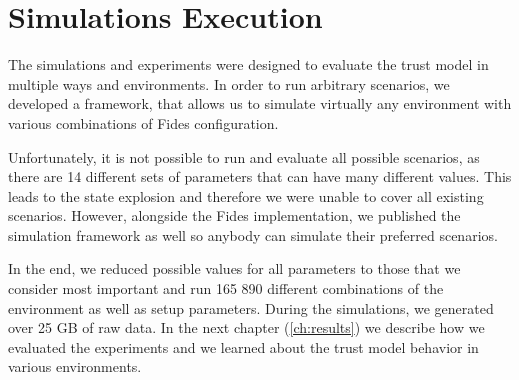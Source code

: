 \section{Simulations Execution}
\label{sec:simulations-execution}
The simulations and experiments were designed to evaluate the trust model in multiple ways and environments.
In order to run arbitrary scenarios, we developed a framework, that allows us to simulate virtually any environment with various combinations of Fides configuration.

Unfortunately, it is not possible to run and evaluate all possible scenarios, as there are 14 different sets of parameters that can have many different values.
This leads to the state explosion and therefore we were unable to cover all existing scenarios. 
However, alongside the Fides implementation, we published the simulation framework as well so anybody can simulate their preferred scenarios.

In the end, we reduced possible values for all parameters to those that we consider most important and run 165 890 different combinations of the environment as well as setup parameters.
During the simulations, we generated over 25 GB of raw data.
In the next chapter (\ref{ch:results}) we describe how we evaluated the experiments and we learned about the trust model behavior in various environments.